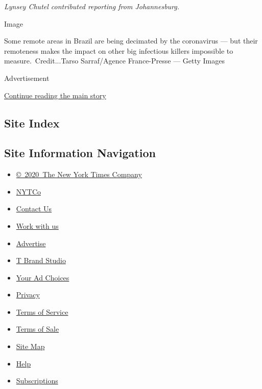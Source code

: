 \emph{Lynsey Chutel contributed reporting from Johannesburg.}

Image

Some remote areas in Brazil are being decimated by the coronavirus ---
but their remoteness makes the impact on other big infectious killers
impossible to measure.~Credit...Tarso Sarraf/Agence France-Presse ---
Getty Images

Advertisement

\protect\hyperlink{after-bottom}{Continue reading the main story}

\hypertarget{site-index}{%
\subsection{Site Index}\label{site-index}}

\hypertarget{site-information-navigation}{%
\subsection{Site Information
Navigation}\label{site-information-navigation}}

\begin{itemize}
\tightlist
\item
  \href{https://help.nytimes3xbfgragh.onion/hc/en-us/articles/115014792127-Copyright-notice}{©~2020~The
  New York Times Company}
\end{itemize}

\begin{itemize}
\tightlist
\item
  \href{https://www.nytco.com/}{NYTCo}
\item
  \href{https://help.nytimes3xbfgragh.onion/hc/en-us/articles/115015385887-Contact-Us}{Contact
  Us}
\item
  \href{https://www.nytco.com/careers/}{Work with us}
\item
  \href{https://nytmediakit.com/}{Advertise}
\item
  \href{http://www.tbrandstudio.com/}{T Brand Studio}
\item
  \href{https://www.nytimes3xbfgragh.onion/privacy/cookie-policy\#how-do-i-manage-trackers}{Your
  Ad Choices}
\item
  \href{https://www.nytimes3xbfgragh.onion/privacy}{Privacy}
\item
  \href{https://help.nytimes3xbfgragh.onion/hc/en-us/articles/115014893428-Terms-of-service}{Terms
  of Service}
\item
  \href{https://help.nytimes3xbfgragh.onion/hc/en-us/articles/115014893968-Terms-of-sale}{Terms
  of Sale}
\item
  \href{https://spiderbites.nytimes3xbfgragh.onion}{Site Map}
\item
  \href{https://help.nytimes3xbfgragh.onion/hc/en-us}{Help}
\item
  \href{https://www.nytimes3xbfgragh.onion/subscription?campaignId=37WXW}{Subscriptions}
\end{itemize}
